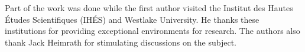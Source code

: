 \documentclass[11pt]{amsart}
\theoremstyle{definition}
\newtheorem*{remark}{Remark}
\begin{document}
%

\bigskip

  Part of the work was done while the first author visited
the Institut des Hautes \'{E}tudes Scientifiques (IH\'{E}S) and Westlake University. He thanks these institutions for providing exceptional environments for research. The authors also thank Jack Heimrath for stimulating discussions on the subject.





\end{document}
